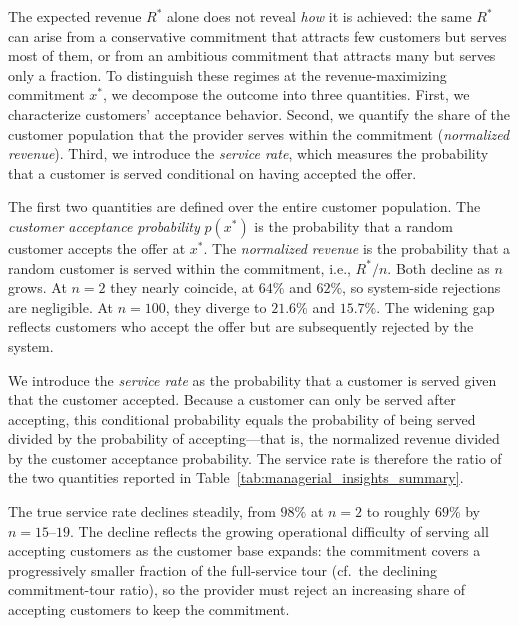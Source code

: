 \documentclass[11pt]{article}
\theoremstyle{plain}
\theoremstyle{definition}
\begin{document}
 The expected revenue $R^*$ alone does not reveal \emph{how} it is achieved: the same $R^*$ can arise from a conservative commitment that attracts few customers but serves most of them, or from an ambitious commitment that attracts many but serves only a fraction. To distinguish these regimes at the revenue-maximizing commitment $x^*$, we decompose the outcome into three quantities. First, we characterize customers' acceptance behavior. Second, we quantify the share of the customer population that the provider serves within the commitment (\emph{normalized revenue}). Third, we introduce the \emph{service rate}, which measures the probability that a customer is served conditional on having accepted the offer.
 
 The first two quantities are defined over the entire customer population. The \emph{customer acceptance probability} $p(x^*)$ is the probability that a random customer accepts the offer at $x^*$. The \emph{normalized revenue} is the probability that a random customer is served within the commitment, i.e., $R^*/n$. Both decline as $n$ grows. At $n = 2$ they nearly coincide, at $64\%$ and $62\%$, so system-side rejections are negligible. At $n = 100$, they diverge to $21.6\%$ and $15.7\%$. The widening gap reflects customers who accept the offer but are subsequently rejected by the system.
 
 We introduce the \emph{service rate} as the probability that a customer is served given that the customer accepted. Because a customer can only be served after accepting, this conditional probability equals the probability of being served divided by the probability of accepting---that is, the normalized revenue divided by the customer acceptance probability. The service rate is therefore the ratio of the two quantities reported in Table~\ref{tab:managerial_insights_summary}.
 
 The true service rate declines steadily, from $98\%$ at $n = 2$ to roughly $69\%$ by $n = 15$--$19$. The decline reflects the growing operational difficulty of serving all accepting customers as the customer base expands: the commitment covers a progressively smaller fraction of the full-service tour (cf.\ the declining commitment-tour ratio), so the provider must reject an increasing share of accepting customers to keep the commitment.
 
\end{document}
